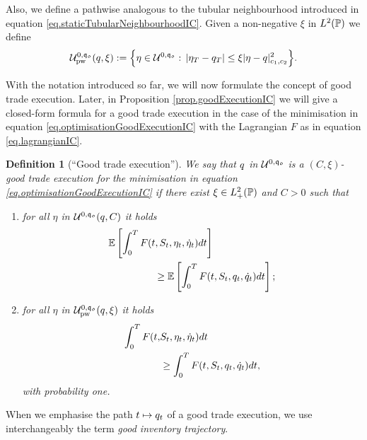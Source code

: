 \documentclass[10pt,a4paper]{article}
\newtheorem{defi}[thm]{Definition}
\begin{document}
	Also, we define a pathwise analogous to the tubular neighbourhood introduced in equation \eqref{eq.staticTubularNeighbourhoodIC}. Given a non-negative $\xi$ in $L^{2}({\mathbb{P}})$ we define
	\begin{equation}\label{eq.pathwiseTuburalNeighbourhoodIC}
	\mathcal{U}^{0,\mathfrak{q_0}}_{\text{pw}}(q,\xi):=
	\Big\lbrace
	\eta \in \mathcal{U}^{0,\mathfrak{q_0}} : \, 
	\left\lvert {\eta_T-q_T} \right\rvert 
	 \leq \xi \lvert \eta-q \rvert_{c_{1},c_{2}}^{2}
	 \Big\rbrace.
	 \end{equation}
	 
	 With the notation introduced so far, we will now formulate the concept of good trade execution. Later, in Proposition \ref{prop.goodExecutionIC} we will give a closed-form formula for a good trade execution in the case of the minimisation in equation \eqref{eq.optimisationGoodExecutionIC} with the Lagrangian $F$ as in equation \eqref{eq.lagrangianIC}.
	 
	 \begin{defi}[``Good trade execution'']\label{defi.goodTradeExecution}
	 	We say that $q$ in $\mathcal{U}^{0,\mathfrak{q_0}}$ is a $(C,\xi)$-good trade execution for the minimisation in equation \eqref{eq.optimisationGoodExecutionIC} if there exist $\xi \in L^{2}_{+} ({\mathbb{P}})$ and $C>0$ such that 
	 	\begin{enumerate}
	 		\item for all $\eta$ in $\mathcal{U}^{0,\mathfrak{q_0}}(q,C)$ it holds
	 		\begin{equation*}
	 		\begin{split}
	 				 \mathbb{{E}} &  \left[	\int_{0}^{T}   F(t,S_t, \eta_t , \dot{\eta}_t )dt \right] \\
	 	& \qquad \qquad \geq 
	 					  \mathbb{{E}}\left[ \int_{0}^{T}  F(t,S_t, q_t,\dot{q}_t)dt\right];
	 		\end{split}
	 		\end{equation*}
	 		\item for all $\eta$ in $\mathcal{U}^{0,\mathfrak{q_0}}_{\text{pw}}(q,\xi)$ it holds
	 		\begin{equation*}
	 		\begin{split}
	 		\int_{0}^{T}F(t,&S_t,\eta_t ,\dot{\eta}_t )dt \\
	 		&\geq
	 		 		\int_{0}^{T} F(t,S_t, q_t,\dot{q}_t)dt,
	 		\end{split}
	 		\end{equation*}
	 		with probability one.
	 	\end{enumerate}
	 \end{defi}
 	When we emphasise the path $t\mapsto q_t$ of a good trade execution, we use  interchangeably the term \emph{good inventory trajectory}.
 	
\end{document}
